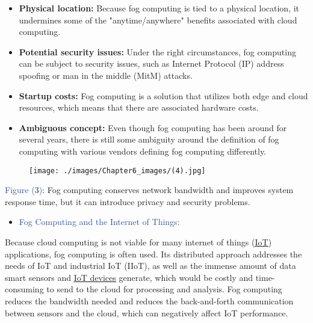 \documentclass[11pt]{article}
\begin{document}
\begin{itemize}
\item \textbf{Physical location:} Because fog computing is tied to a physical location, it undermines some of the "anytime/anywhere" benefits associated with cloud computing.

\item \textbf{Potential security issues:} Under the right circumstances, fog computing can be subject to security issues, such as Internet Protocol (IP) address spoofing or man in the middle (MitM) attacks.

\item \textbf{Startup costs:} Fog computing is a solution that utilizes both edge and cloud resources, which means that there are associated hardware costs.

\item \textbf{Ambiguous concept:} Even though fog computing has been around for several years, there is still some ambiguity around the definition of fog computing with various vendors defining fog computing differently.
\end{itemize}



\newpage

\vspace{1\baselineskip}
\begin{figure}[H]
\texttt{[image: ./images/Chapter6\_images/(4).jpg]}
\end{figure}

\textcolor[HTML]{2F5496}{Figure (}3\textcolor[HTML]{2F5496}{)}: Fog computing conserves network bandwidth and improves system response time, but it can introduce privacy and security problems.

\vspace{1\baselineskip}
\begin{itemize}
\item {\large \textcolor[HTML]{2F5496}{Fog Computing and the Internet of Things:}}
\end{itemize}

Because cloud computing is not viable for many internet of things (\href{https://www.techtarget.com/iotagenda/definition/Internet-of-Things-IoT?_gl=1*1kmu6y5*_ga*MTY4NTMwOTYuMTYzNDEyODU1MQ..*_ga_TQKE4GS5P9*MTY1MTc1NTYwNS40LjEuMTY1MTc2MTA0OS4w&_ga=2.199820974.1003404945.1651755607-16853096.1634128551}{\uline{IoT}}) applications, fog computing is often used. Its distributed approach addresses the needs of IoT and industrial IoT (IIoT), as well as the immense amount of data smart sensors and \href{https://www.techtarget.com/iotagenda/definition/IoT-device?_gl=1*gjpo70*_ga*MTY4NTMwOTYuMTYzNDEyODU1MQ..*_ga_TQKE4GS5P9*MTY1MTc1NTYwNS40LjEuMTY1MTc2MTMwMi4w&_ga=2.223471131.1003404945.1651755607-16853096.1634128551}{\uline{IoT devices}} generate, which would be costly and time-consuming to send to the cloud for processing and analysis. Fog computing reduces the bandwidth needed and reduces the back-and-forth communication between sensors and the cloud, which can negatively affect IoT performance.
\end{document}
